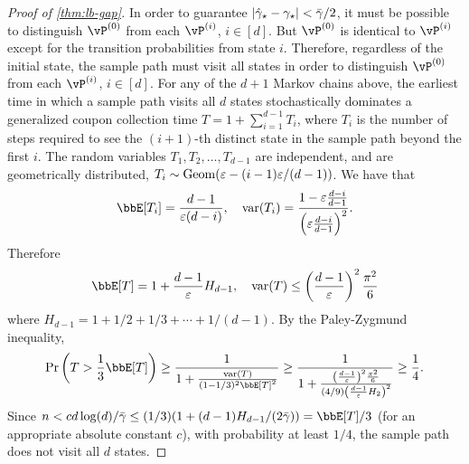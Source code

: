 \begin{proof}[Proof of \cref{thm:lb-gap}]
  In order to guarantee $|\hat\gamma_{\star} - \gamma_{\star}| < \bar\gamma/2$, it must
  be possible to distinguish $\vP^{(0)}$ from each $\vP^{(i)}$,
  $i\in[d]$.
  But $\vP^{(0)}$ is identical to $\vP^{(i)}$ except for the transition
  probabilities from state $i$.
  Therefore, regardless of the initial state, the sample path must
  visit all states in order to distinguish $\vP^{(0)}$ from each
  $\vP^{(i)}$, $i \in [d]$.
  For any of the $d+1$ Markov chains above, the earliest time in which
  a sample path visits all $d$ states
  stochastically dominates a generalized coupon collection time $T = 1 +
  \sum_{i=1}^{d-1} T_i$, where $T_i$ is the number of steps required to
  see the $(i+1)$-th distinct state in the sample path beyond the first
  $i$.
  The random variables $T_1,T_2,\dotsc,T_{d-1}$ are independent, and are
  geometrically distributed, $T_i \sim \operatorname{Geom}(\varepsilon -
  (i-1)\varepsilon/(d-1))$.
  We have that
  \[
    \bbE[T_i] = \frac{d-1}{\veps(d-i)} , \quad
    \var(T_i) = \frac{1 - \veps \frac{d-i}{d-1}}{%
      \Parens{ \veps \frac{d-i}{d-1} }^2
    }
    .
  \]
  Therefore
  \[
    \bbE[T] = 1 + \frac{d-1}{\veps} H_{d-1} , \quad
    \var(T) \leq \Parens{ \frac{d-1}{\veps} }^2 \frac{\pi^2}{6} 
  \]
  where $H_{d-1} = 1 + 1/2 + 1/3 + \dotsb + 1/(d-1)$.
  By the Paley-Zygmund inequality,
  \[
    \Pr\Parens{ T > \frac13\bbE[T] }
    \geq \frac{1}{1 + \frac{\var(T)}{(1-1/3)^2\bbE[T]^2}}
    \geq \frac{1}{1 + \frac{\Parens{ \frac{d-1}{\veps} }^2
    \frac{\pi^2}{6}}{(4/9)\Parens{ \frac{d-1}{\veps} H_2}^2}}
    \geq \frac14
    .
  \]
  Since $n < c d\log(d) / \bar\gamma \leq (1/3) (1 + (d-1) H_{d-1} /
  (2\bar\gamma)) = \bbE[T]/3$ (for an appropriate absolute constant
  $c$), with probability at least $1/4$, the sample path does not
  visit all $d$ states.
\end{proof}


